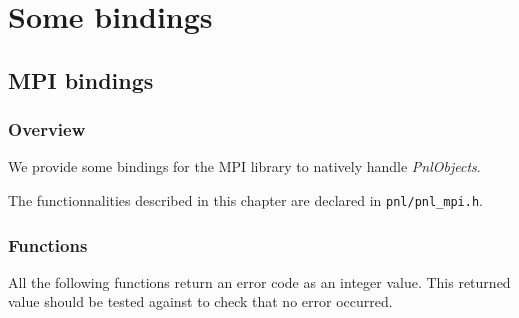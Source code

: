 \section{Some bindings}

\subsection{MPI bindings}
\subsubsection{Overview}

We provide some bindings for the MPI library to natively handle {\it PnlObjects}.

The functionnalities described in this chapter are declared in \verb!pnl/pnl_mpi.h!.

\subsubsection{Functions}

All the following functions return an error code as an integer value. This
returned value should be tested against  to check that no
error occurred.

